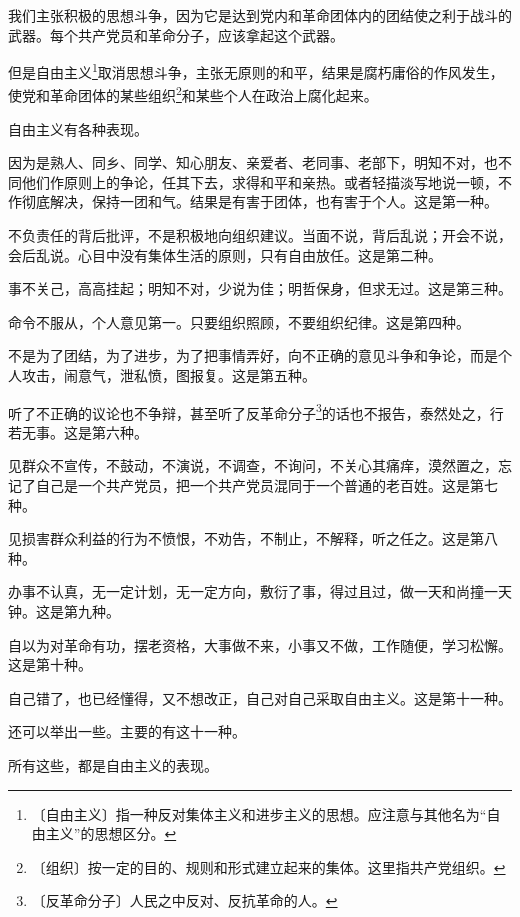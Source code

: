 \documentclass[12pt,UTF-8,openany]{ctexbook}
\begin{document}
\begin{normalsize}
    
    我们主张积极的思想斗争，因为它是达到党内和革命团体内的团结使之利于战斗的武器。每个共产党员和革命分子，应该拿起这个武器。
    
    但是自由主义\footnote{〔自由主义〕指一种反对集体主义和进步主义的思想。应注意与其他名为“自由主义”的思想区分。}取消思想斗争，主张无原则的和平，结果是腐朽庸俗的作风发生，使党和革命团体的某些组织\footnote{〔组织〕按一定的目的、规则和形式建立起来的集体。这里指共产党组织。}和某些个人在政治上腐化起来。
    
    自由主义有各种表现。
    
    因为是熟人、同乡、同学、知心朋友、亲爱者、老同事、老部下，明知不对，也不同他们作原则上的争论，任其下去，求得和平和亲热。或者轻描淡写地说一顿，不作彻底解决，保持一团和气。结果是有害于团体，也有害于个人。这是第一种。
    
    不负责任的背后批评，不是积极地向组织建议。当面不说，背后乱说；开会不说，会后乱说。心目中没有集体生活的原则，只有自由放任。这是第二种。
    
    事不关己，高高挂起；明知不对，少说为佳；明哲保身，但求无过。这是第三种。
    
    命令不服从，个人意见第一。只要组织照顾，不要组织纪律。这是第四种。
    
    不是为了团结，为了进步，为了把事情弄好，向不正确的意见斗争和争论，而是个人攻击，闹意气，泄私愤，图报复。这是第五种。
    
    听了不正确的议论也不争辩，甚至听了反革命分子\footnote{〔反革命分子〕人民之中反对、反抗革命的人。}的话也不报告，泰然处之，行若无事。这是第六种。
    
    见群众不宣传，不鼓动，不演说，不调查，不询问，不关心其痛痒，漠然置之，忘记了自己是一个共产党员，把一个共产党员混同于一个普通的老百姓。这是第七种。
    
    见损害群众利益的行为不愤恨，不劝告，不制止，不解释，听之任之。这是第八种。
    
    办事不认真，无一定计划，无一定方向，敷衍了事，得过且过，做一天和尚撞一天钟。这是第九种。
    
    自以为对革命有功，摆老资格，大事做不来，小事又不做，工作随便，学习松懈。这是第十种。
    
    自己错了，也已经懂得，又不想改正，自己对自己采取自由主义。这是第十一种。
    
    还可以举出一些。主要的有这十一种。
    
    所有这些，都是自由主义的表现。
    

\end{normalsize}
\end{document}
